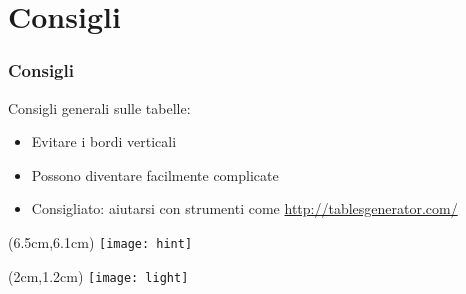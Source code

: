 \section{Consigli}
\begin{frame}
 
 \frametitle{Consigli}
 
 Consigli generali sulle tabelle:
 \begin{itemize}
  \item Evitare i bordi verticali
  \item Possono diventare facilmente complicate
  \item Consigliato: aiutarsi con strumenti come 
\url{http://tablesgenerator.com/}
 \end{itemize}

 \begin{textblock*}{5cm}(6.5cm,6.1cm)
   \texttt{[image: hint]}
  \end{textblock*}
  
  
 \begin{textblock*}{5cm}(2cm,1.2cm)
   \texttt{[image: light]}
  \end{textblock*}
\end{frame}
